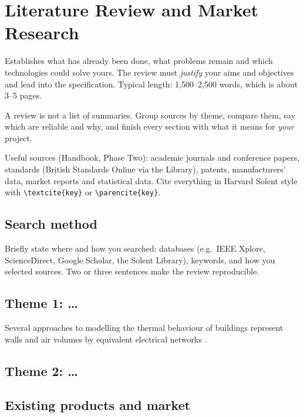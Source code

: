\chapter{Literature Review and Market Research}
\label{ch:literature}

\begin{guidance}
Establishes what has already been done, what problems remain and which
technologies could solve yours. The review must \emph{justify} your aims and
objectives and lead into the specification. Typical length: 1,500--2,500
words, which is about 3--5 pages.

A review is not a list of summaries. Group sources by theme, compare them,
say which are reliable and why, and finish every section with what it means
for \emph{your} project.

Useful sources (Handbook, Phase Two): academic journals and conference
papers, standards (British Standards Online via the Library), patents,
manufacturers' data, market reports and statistical data. Cite everything in
Harvard Solent style with \verb|\textcite{key}| or \verb|\parencite{key}|.
\end{guidance}

\section{Search method}
\label{sec:search}

\begin{guidance}
Briefly state where and how you searched: databases (e.g.\ IEEE Xplore,
ScienceDirect, Google Scholar, the Solent Library), keywords, and how you
selected sources. Two or three sentences make the review reproducible.
\end{guidance}

\section{Theme 1: \ldots}
\label{sec:theme1}

Several approaches to modelling the thermal behaviour of buildings
represent walls and air volumes by equivalent electrical networks
\parencite{achterbosch1985}. 

\section{Theme 2: \ldots}
\label{sec:theme2}

\section{Existing products and market}
\label{sec:market}

